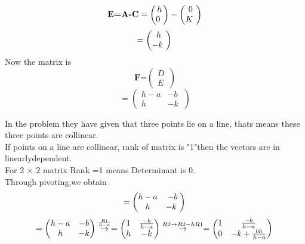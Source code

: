 \documentclass[10pt, a4paper]{article}
\begin{document}
\begin{equation}\label{eq:}
\textbf{E=A-C}\\
=\begin{pmatrix} h\\ 0\ \end{pmatrix}- \begin{pmatrix} 0\\ K\ \end{pmatrix}
\end{equation}
\begin{equation}\label{eq:}
=\begin{pmatrix} h\\ -k\ \end{pmatrix}\\
\end{equation}
\boldmath
Now the matrix is\\
\begin{equation}\label{eq:}
\textbf{F=$\begin{pmatrix} D\\ E\ \end{pmatrix}$}
\end{equation}
\unboldmath
\begin{equation} \label{eq:}
=\begin{pmatrix} h-a & -b\\ h & -k \ \end{pmatrix} 
\end{equation}

In the problem they have given that three points lie on a line, thats means these three points are collinear.\\
If  points on a line  are  collinear, rank of matrix is "1"then the vectors are in linearlydependent.\\
For 2 × 2 matrix Rank =1 means Determinant is 0.\\
Through pivoting,we obtain\\
\begin{equation}\label{eq:}
=\begin{pmatrix} h-a & -b\\ h & -k \ \end{pmatrix} \\ 
\end{equation}
\begin{equation}\label{eq:}
=\begin{pmatrix}
h-a &-b \\ 
 h& -k
\end{pmatrix}\overset{\frac{R1}{h-a}}{\rightarrow}
=\begin{pmatrix}
1 &\frac{-b}{h-a} \\ 
 h& -k
\end{pmatrix}\overset{R2\rightarrow R2-hR1}{\rightarrow}
=\begin{pmatrix}
1 &\frac{-b}{h-a} \\ 
 0&-k+\frac{bh}{h-a} 
\end{pmatrix}\\
\end{equation} 
\end{document}
